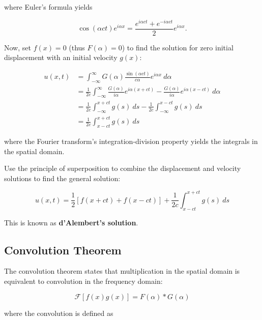 where Euler's formula yields

\begin{equation*}
    \cos(\alpha ct)e^{i\alpha x} = \frac{e^{i\alpha ct} + e^{-i\alpha ct}}{2}e^{i\alpha x}\text{.}
\end{equation*}

Now, set $f(x) = 0$ (thus $F(\alpha) = 0$) to find the solution for zero initial displacement with an initial velocity $g(x)$:

\begin{align*}
    u(x,t) & = \int_{-\infty}^\infty G(\alpha) \frac{\sin(\alpha ct)}{c\alpha} e^{i\alpha x}~d\alpha                                                \\
           & = \frac{1}{2c}\int_{-\infty}^\infty \frac{G(\alpha)}{i\alpha} e^{i\alpha(x+ct)} - \frac{G(\alpha)}{i\alpha} e^{i\alpha(x-ct)} ~d\alpha \\
           & = \frac{1}{2c} \int_{-\infty}^{x + ct}g(s)~ds - \frac{1}{2c} \int_{-\infty}^{x - ct}g(s)~ds                                            \\
           & = \frac{1}{2c} \int_{x - ct}^{x + ct}g(s)~ds
\end{align*}

where the Fourier transform's integration-division property yields the integrals in the spatial domain.

\vsp

Use the principle of superposition to combine the displacement and velocity solutions to find the general solution:

\begin{equation*}
    u(x,t) = \frac{1}{2}\left[f(x + ct) + f(x - ct)\right] + \frac{1}{2c} \int_{x - ct}^{x + ct}g(s)~ds
\end{equation*}

This is known as \textbf{d'Alembert's solution}.

\subsection{Convolution Theorem}

The convolution theorem states that multiplication in the spatial domain is equivalent to convolution in the frequency domain:

\begin{equation*}
    \mathcal{F}\left[f(x)g(x)\right] = F(\alpha) \ast G(\alpha)
\end{equation*}

where the convolution is defined as


